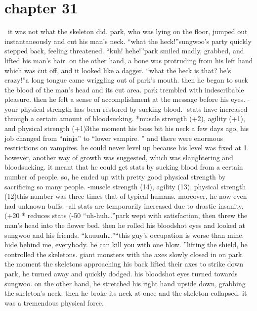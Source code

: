 \section{chapter 31}






 it was not what the skeleton did.
 park, who was lying on the floor, jumped out instantaneously and cut his man’s neck.
“what the heck!”sungwoo’s party quickly stepped back, feeling threatened.
“kuh! hehe!”park smiled madly, grabbed, and lifted his man’s hair.
 on the other hand, a bone was protruding from his left hand which was cut off, and it looked like a dagger.
“what the heck is that? he’s crazy!”a long tongue came wriggling out of park’s mouth.
 then he began to suck the blood of the man’s head and its cut area.
park trembled with indescribable pleasure.
then he felt a sense of accomplishment at the message before his eyes.
-your physical strength has been restored by sucking blood.
-stats have increased through a certain amount of bloodsucking.
*muscle strength (+2), agility (+1), and physical strength (+1)3the moment his boss bit his neck a few days ago, his job changed from “ninja” to “lower vampire.
” and there were enormous restrictions on vampires.
 he could never level up because his level was fixed at 1.
however, another way of growth was suggested, which was slaughtering and bloodsucking.
it meant that he could get stats by sucking blood from a certain number of people.
so, he ended up with pretty good physical strength by sacrificing so many people.
-muscle strength (14), agility (13), physical strength (12)this number was three times that of typical humans.
moreover, he now even had unknown buffs.
-all stats are temporarily increased due to drastic insanity.
 (+20%
* reduces stats (-50%
“uh-huh…”park wept with satisfaction, then threw the man’s head into the flower bed.
 then he rolled his bloodshot eyes and looked at sungwoo and his friends.
“kuuuuh…”“this guy’s occupation is worse than mine.
 hide behind me, everybody.
 he can kill you with one blow.
”lifting the shield, he controlled the skeletons.
 giant monsters with the axes slowly closed in on park.
 the moment the skeletons approaching his back lifted their axes to strike down park, he turned away and quickly dodged.
 his bloodshot eyes turned towards sungwoo.
 on the other hand, he stretched his right hand upside down, grabbing the skeleton’s neck.
then he broke its neck at once and the skeleton collapsed.
 it was a tremendous physical force.
